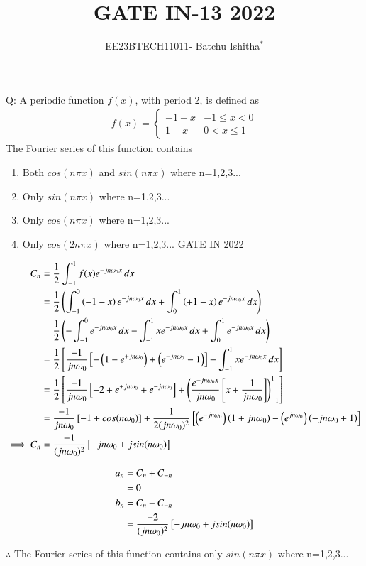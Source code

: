 \documentclass[journal,12pt,onecolumn]{IEEEtran}
\theoremstyle{remark}
\begin{document}
\let\vec\mathbf



\title{ GATE IN-13 2022}
\author{EE23BTECH11011- Batchu Ishitha$^{*}$%
}
\maketitle




\bigskip

\renewcommand{\thefigure}{\theenumi}
\renewcommand{\thetable}{\theenumi}

Q: A periodic function $f(x)$, with period 2, is defined as \\
   \begin{align}   
   f(x) =
   \begin{cases}
    -1-x & -1 \leq x<0 \\
     1-x &  0 <x \leq1 
   \end{cases}
   \end{align} 
   The Fourier series of this function contains \\
\begin{enumerate}[label=\Alph*.]
\item Both $cos(n\pi x)$ and $sin(n\pi x)$ where n=1,2,3...
\item Only $sin(n\pi x)$ where n=1,2,3...
\item Only $cos(n\pi x)$ where n=1,2,3...
\item Only $cos(2n\pi x)$ where n=1,2,3...  \hfill{GATE IN 2022 }
\end{enumerate} 

\solution

\begin{align}
C_{n} &= \frac{1}{2} \int_{-1}^{1} f(x) e^{-jn\omega_{0}x} \, dx \\
&= \frac{1}{2} \left( \int_{-1}^{0}\left(-1-x\right)e^{-jn\omega_{0}x} \, dx +  \int_{0}^{1}\left(+1-x\right)e^{-jn\omega_{0}x} \, dx \right) \\
&= \frac{1}{2} \left(-\int_{-1}^{0}e^{-jn\omega_{0}x} \, dx-\int_{-1}^{1}xe^{-jn\omega_{0}x} \, dx + \int_{0}^{1}e^{-jn\omega_{0}x} \, dx\right) \\
&= \frac{1}{2} {}\left[\frac{-1}{jn\omega_{0}}{}\left[-\left(1 - e^{+jn\omega_{0}}\right) + \left(e^{-jn\omega_{0}} -1\right)\right] -\int_{-1}^{1}xe^{-jn\omega_{0}x} \, dx\right] \\
&= \frac{1}{2} {}\left[\frac{-1}{jn\omega_{0}}{}\left[-2 +e^{+jn\omega_{0}} + e^{-jn\omega_{0}}\right] +\left(\frac{e^{-jn\omega_{0}x}}{jn\omega_{0}}{}\left[x + \frac{1}{jn\omega_{0}}\right]\right)_{-1}^{1}\right] \\
&= \frac{-1}{jn\omega_{0}}{}\left[-1 + cos(n\omega_{0})\right] + \frac{1}{2(jn\omega_{0})^2}{}\left[\left(e^{-jn\omega_{0}}  \right)\left(1+jn\omega_{0}\right)- \left(e^{jn\omega_{0}} \right)\left(-jn\omega_{0}+1\right)\right] \\
\implies C_{n}&= \frac{-1}{(jn\omega_{0})^2}{}\left[-jn\omega_{0} + j sin(n\omega_{0})\right]
\end{align} 

\begin{align}
a_n &= C_{n} + C_{-n} \\
&= 0 \\
b_n &= C_{n} - C_{-n} \\
&= \frac{-2}{(jn\omega_{0})^2}{}\left[-jn\omega_{0} + j sin(n\omega_{0})\right] 
\end{align}

 $\therefore$ The Fourier series of this function contains only $sin(n\pi x)$ where n=1,2,3...
 
\end{document}
